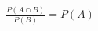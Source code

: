 \documentclass[preview]{standalone}
\begin{document}
\begin{align*}
\frac{P(A \cap B)}{P(B)} = P(A)
\end{align*}
\end{document}

